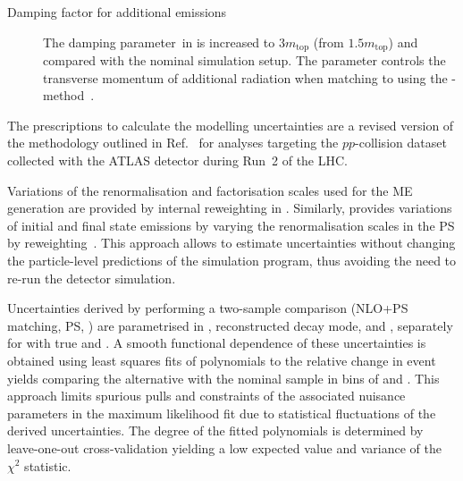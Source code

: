 \begin{description}
\item[Damping factor for additional emissions] The damping
  parameter~\hdamp in \POWHEGBOX[v2] is increased to $3 m_\text{top}$
  (from $1.5 m_\text{top}$) and compared with the nominal simulation
  setup. The \hdamp parameter controls the transverse momentum of
  additional radiation when matching \POWHEGBOX[v2] to \PYTHIA[8]
  using the
  \POWHEG-method~\cite{ATL-PHYS-PUB-2016-020,ATL-PHYS-PUB-2020-023}.

\end{description}
The prescriptions to calculate the \ttbar modelling uncertainties are
a revised version of the methodology outlined in
Ref.~\cite{ATL-PHYS-PUB-2020-023} for analyses targeting the
$pp$-collision dataset collected with the ATLAS detector during Run~2
of the LHC.

Variations of the renormalisation and factorisation scales used for
the ME generation are provided by internal reweighting in
\POWHEGBOX[v2]. Similarly, \PYTHIA[8] provides variations of initial
and final state emissions by varying the renormalisation scales in the
PS by reweighting~\cite{Mrenna:2016sih,pythia-variations-online}. This
approach allows to estimate uncertainties without changing the
particle-level predictions of the simulation program, thus avoiding
the need to re-run the detector simulation.

Uncertainties derived by performing a two-sample comparison (NLO+PS
matching, PS, \hdamp) are parametrised in \tauhadvis \pT,
reconstructed \tauhadvis decay mode, and \mTW, separately for \ttbar
with true and \faketauhadvis. A smooth functional dependence of these
uncertainties is obtained using least squares fits of polynomials to
the relative change in event yields comparing the alternative with the
nominal sample in bins of \tauhadvis \pT and \mTW. This approach
limits spurious pulls and constraints of the associated nuisance
parameters in the maximum likelihood fit due to statistical
fluctuations of the derived uncertainties. The degree of the fitted
polynomials is determined by leave-one-out cross-validation yielding a
low expected value and variance of the $\chi^2$ statistic.

